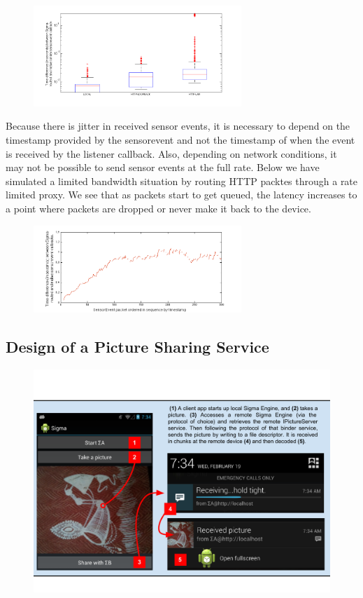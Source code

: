 \documentclass[prodmode]{acmlarge}
\begin{document}
\begin{figure}[h]
\centering
\includegraphics[width=0.7\textwidth]{plots/sensorevent_delay.png}
\end{figure}

Because there is jitter in received sensor events, it is necessary to depend on the timestamp provided by the sensorevent and not the timestamp of when the event is received by the listener callback. Also, depending on network conditions, it may not be possible to send sensor events at the full rate. Below we have simulated a limited bandwidth situation by routing HTTP packtes through a rate limited proxy. We see that as packets start to get queued, the latency increases to a point where packets are dropped or never make it back to the device.

\begin{figure}[h]
\centering
\includegraphics[width=0.7\textwidth]{plots/limited_bandwidth_increasing_latency.png}
\end{figure}

\subsection{Design of a Picture Sharing Service}
\begin{figure}[h]
\centering
\includegraphics[width=\textwidth]{drawings/PictureChatExample.pdf}
\end{figure}
\end{document}

